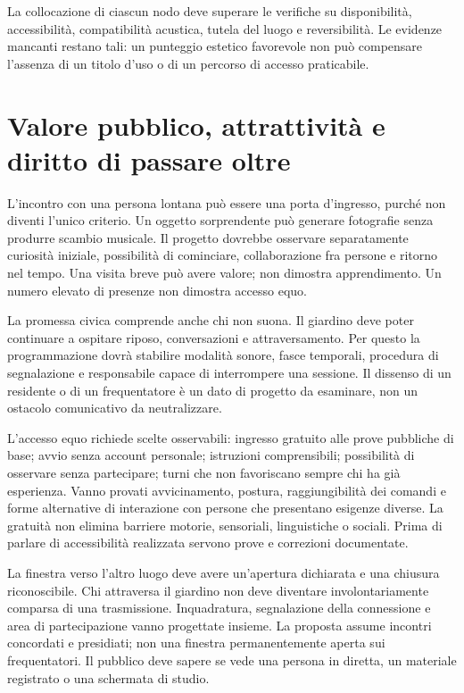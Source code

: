 La collocazione di ciascun nodo deve superare le verifiche su disponibilità,
accessibilità, compatibilità acustica, tutela del luogo e reversibilità.
Le evidenze mancanti restano tali: un punteggio estetico favorevole non può
compensare l'assenza di un titolo d'uso o di un percorso di accesso praticabile.

\section{Valore pubblico, attrattività e diritto di passare oltre}
L'incontro con una persona lontana può essere una porta d'ingresso, purché non diventi l'unico
criterio. Un oggetto sorprendente può generare fotografie senza produrre
scambio musicale. Il progetto dovrebbe osservare separatamente curiosità
iniziale, possibilità di cominciare, collaborazione fra persone e ritorno
nel tempo. Una visita breve può avere valore; non dimostra apprendimento.
Un numero elevato di presenze non dimostra accesso equo.

La promessa civica comprende anche chi non suona. Il giardino deve poter
continuare a ospitare riposo, conversazioni e attraversamento. Per questo
la programmazione dovrà stabilire modalità sonore, fasce temporali,
procedura di segnalazione e responsabile capace di interrompere una
sessione. Il dissenso di un residente o di un frequentatore è un dato di
progetto da esaminare, non un ostacolo comunicativo da neutralizzare.

L'accesso equo richiede scelte osservabili: ingresso gratuito alle prove
pubbliche di base; avvio senza account personale; istruzioni comprensibili;
possibilità di osservare senza partecipare; turni che non favoriscano
sempre chi ha già esperienza. Vanno provati avvicinamento, postura,
raggiungibilità dei comandi e forme alternative di interazione con persone
che presentano esigenze diverse. La gratuità non elimina barriere motorie,
sensoriali, linguistiche o sociali. Prima di parlare di accessibilità
realizzata servono prove e correzioni documentate.


La finestra verso l'altro luogo deve avere un'apertura dichiarata e una
chiusura riconoscibile. Chi attraversa il giardino non deve diventare
involontariamente comparsa di una trasmissione. Inquadratura, segnalazione
della connessione e area di partecipazione vanno progettate insieme.
La proposta assume incontri concordati e presidiati; non una finestra
permanentemente aperta sui frequentatori. Il pubblico deve sapere se vede
una persona in diretta, un materiale registrato o una schermata di studio.

